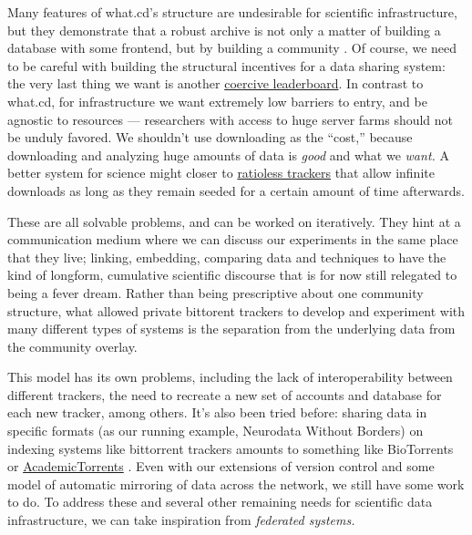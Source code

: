 \documentclass[10pt]{article}
\begin{document}
\begin{multicols}{2}
Many features of what.cd's structure are undesirable for scientific
infrastructure, but they demonstrate that a robust archive is not only a
matter of building a database with some frontend, but by building a
community \cite{brossCommunityCollaborationContribution2013} . Of
course, we need to be careful with building the structural incentives
for a data sharing system: the very last thing we want is another
\href{https://etiennelebel.com/cs/t-leaderboard/t-leaderboard.html}{coercive
leaderboard}. In contrast to what.cd, for infrastructure we want
extremely low barriers to entry, and be agnostic to resources ---
researchers with access to huge server farms should not be unduly
favored. We shouldn't use downloading as the ``cost,'' because
downloading and analyzing huge amounts of data is \emph{good} and what
we \emph{want.} A better system for science might closer to
\href{https://wiki.installgentoo.com/wiki/Private_trackers\#No_economy}{ratioless
trackers} that allow infinite downloads as long as they remain seeded
for a certain amount of time afterwards.

These are all solvable problems, and can be worked on iteratively. They
hint at a communication medium where we can discuss our experiments in
the same place that they live; linking, embedding, comparing data and
techniques to have the kind of longform, cumulative scientific discourse
that is for now still relegated to being a fever dream. Rather than
being prescriptive about one community structure, what allowed private
bittorent trackers to develop and experiment with many different types
of systems is the separation from the underlying data from the community
overlay.

This model has its own problems, including the lack of interoperability
between different trackers, the need to recreate a new set of accounts
and database for each new tracker, among others. It's also been tried
before: sharing data in specific formats (as our running example,
Neurodata Without Borders) on indexing systems like bittorrent trackers
amounts to something like BioTorrents \cite{langilleBioTorrentsFileSharing2010}  or
\href{https://academictorrents.com/}{AcademicTorrents} \cite{cohenAcademicTorrentsCommunityMaintained2014} . Even with our
extensions of version control and some model of automatic mirroring of
data across the network, we still have some work to do. To address these
and several other remaining needs for scientific data infrastructure, we
can take inspiration from \emph{federated systems.}


\end{multicols}
\end{document}
